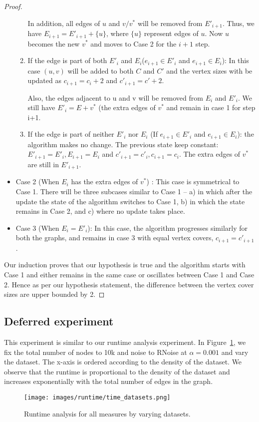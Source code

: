 \begin{proof}
\begin{itemize}
\begin{enumerate}[label=\alph*),ref=\alph*]
            In addition, all edges of $u$ and $v/v^*$ will be removed from $E'_{i+1}$. Thus, we have $E_{i+1} = E'_{i+1} + \{u\}$, where $\{u\}$ represent edges of $u$. Now $u$ becomes the new $v^*$ and moves to Case 2 for the $i+1$ step.  
            
            \item If the edge is part of both $E'_i$ and $E_i$($e_{i+1} \in E'_i$ and $e_{i+1} \in E_i$): In this case $(u,v)$ will be added to both $C$ and $C'$ and the vertex sizes with be updated as $c_{i+1} = c_i + 2$ and $c'_{i+1} = c' + 2$. 

            Also, the edges adjacent to u and v will be removed from $E_i$ and $E'_i$. We still have $E'_i = E + {v^*}$ (the extra edges of $v^*$ and remain in case 1 for step i+1. 

            \item If the edge is part of neither $E'_i$ nor $E_i$ (If $e_{i+1} \in E'_i$ and $e_{i+1} \in E_i$): the algorithm makes no change. The previous state keep constant: $E'_{i+1} = E'_i, E_{i+1} = E_i$ and $c'_{i+1} = c'_i, c_{i+1} = c_i$. The extra edges of $v^*$ are still in $E'_{i+1}$.
        \end{enumerate}
        
    \item Case 2 (When $E_i$ has the extra edges of $v^*$) : This case is symmetrical to Case 1. There will be three subcases similar to Case 1 -- a) in which after the update the state of the algorithm switches to Case 1, b) in which the state remains in Case 2, and c) where no update takes place.  

    \item Case 3 (When $E_i = E'_i$): In this case, the algorithm progresses similarly for both the graphs, and remains in case 3 with equal vertex covers, $c_{i+1} = c'_{i+1}$.
\end{itemize}

Our induction proves that our hypothesis is true and the algorithm starts with Case 1 and either remains in the same case or oscillates between Case 1 and Case 2. Hence as per our hypothesis statement, the difference between the vertex cover sizes are upper bounded by 2.
\end{proof}

\subsection{Deferred experiment}
This experiment is similar to our runtime analysis experiment. In Figure~\ref{fig:time_datasets}, we fix the total number of nodes to 10k and noise to RNoise at $\alpha=0.001$ and vary the dataset. The x-axis is ordered according to the density of the dataset. We observe that the runtime is proportional to the density of the dataset and increases exponentially with the total number of edges in the graph. 
\begin{figure}
    \centering
    \texttt{[image: images/runtime/time\_datasets.png]}
    \caption{Runtime analysis for all measures by varying datasets.}
    \label{fig:time_datasets}
\end{figure}

